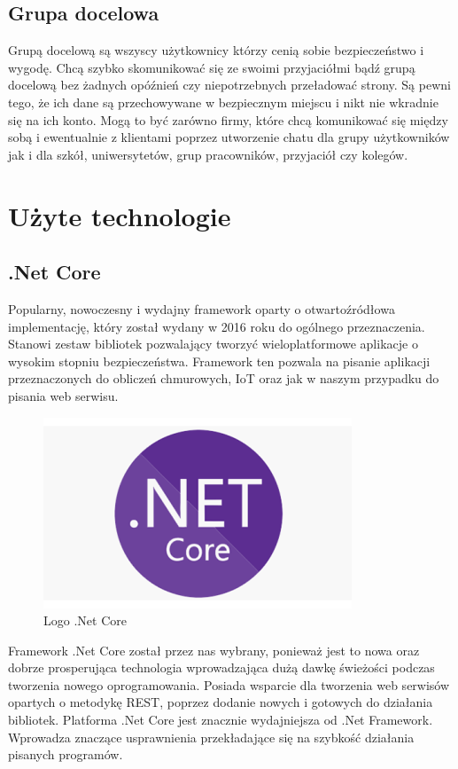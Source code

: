 \documentclass[10pt,a4paper]{article}
\begin{document}
\subsection{Grupa docelowa}
\hspace*{0.7cm} Grupą docelową są wszyscy użytkownicy którzy cenią sobie bezpieczeństwo i wygodę. Chcą szybko skomunikować się ze swoimi przyjaciółmi bądź grupą docelową
bez żadnych opóźnień czy niepotrzebnych przeładować strony. Są pewni tego, że ich dane są przechowywane w bezpiecznym miejscu i nikt nie wkradnie się na ich
konto. Mogą to być zarówno firmy, które chcą komunikować się między sobą i ewentualnie z klientami poprzez utworzenie chatu dla grupy użytkowników jak i dla szkół, uniwersytetów, grup pracowników, przyjaciół czy kolegów. 


\section{Użyte technologie}

\subsection{.Net Core} 			%
\hspace*{0.7cm} Popularny, nowoczesny i wydajny framework oparty o otwartoźródłowa implementację, który został wydany w 2016 roku do ogólnego przeznaczenia. Stanowi zestaw bibliotek pozwalający tworzyć wieloplatformowe aplikacje o wysokim stopniu bezpieczeństwa. Framework ten pozwala na pisanie aplikacji przeznaczonych do obliczeń chmurowych, IoT oraz jak w naszym przypadku do pisania web serwisu. 

\begin{figure}[h]
	\centering
	\includegraphics[width=0.3\linewidth]{dotnet5_platform}
	\caption{Logo .Net Core}
	\label{fig:dotnet5platform}
\end{figure}

Framework .Net Core został przez nas wybrany, ponieważ jest to nowa oraz dobrze prosperująca technologia wprowadzająca dużą dawkę świeżości podczas tworzenia nowego oprogramowania. Posiada wsparcie dla tworzenia web serwisów opartych o metodykę REST, poprzez dodanie nowych i gotowych do działania bibliotek. Platforma .Net Core jest znacznie wydajniejsza od .Net Framework. Wprowadza znaczące usprawnienia przekładające się na szybkość działania pisanych programów.
\end{document}
